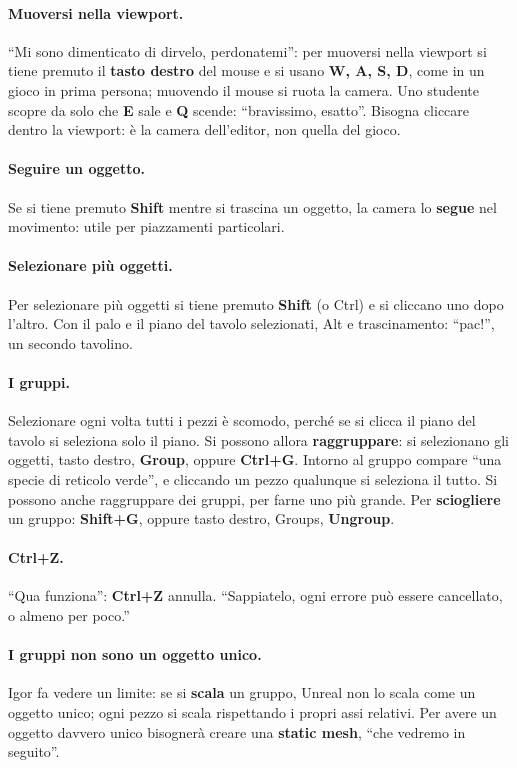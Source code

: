 \paragraph{Muoversi nella viewport.} ``Mi sono dimenticato di dirvelo, perdonatemi'':
per muoversi nella viewport si tiene premuto il \textbf{tasto destro} del mouse e si
usano \textbf{W, A, S, D}, come in un gioco in prima persona; muovendo il mouse si
ruota la camera. Uno studente scopre da solo che \textbf{E} sale e \textbf{Q} scende:
``bravissimo, esatto''. Bisogna cliccare dentro la viewport: è la camera dell'editor,
non quella del gioco.

\paragraph{Seguire un oggetto.} Se si tiene premuto \textbf{Shift} mentre si trascina un
oggetto, la camera lo \textbf{segue} nel movimento: utile per piazzamenti
particolari.

\paragraph{Selezionare più oggetti.} Per selezionare più oggetti si tiene premuto
\textbf{Shift} (o Ctrl) e si cliccano uno dopo l'altro. Con il palo e il piano del
tavolo selezionati, Alt e trascinamento: ``pac!'', un secondo tavolino.

\paragraph{I gruppi.} Selezionare ogni volta tutti i pezzi è scomodo, perché se si
clicca il piano del tavolo si seleziona solo il piano. Si possono allora
\textbf{raggruppare}: si selezionano gli oggetti, tasto destro, \textbf{Group}, oppure
\textbf{Ctrl+G}. Intorno al gruppo compare ``una specie di reticolo verde'', e cliccando
un pezzo qualunque si seleziona il tutto. Si possono anche raggruppare dei gruppi, per
farne uno più grande. Per \textbf{sciogliere} un gruppo: \textbf{Shift+G}, oppure tasto
destro, Groups, \textbf{Ungroup}.

\paragraph{Ctrl+Z.} ``Qua funziona'': \textbf{Ctrl+Z} annulla. ``Sappiatelo, ogni
errore può essere cancellato, o almeno per poco.''

\paragraph{I gruppi non sono un oggetto unico.} Igor fa vedere un limite: se si
\textbf{scala} un gruppo, Unreal non lo scala come un oggetto unico; ogni pezzo si
scala rispettando i propri assi relativi. Per avere un oggetto davvero unico bisognerà
creare una \textbf{static mesh}, ``che vedremo in seguito''.

